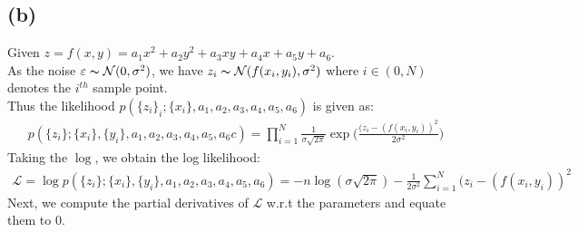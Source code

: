 \documentclass[11pt, fleqn]{article}
\begin{document}
\subsection*{(b)}
Given $z = f(x,y) = a_1 x^2 + a_2 y^2 + a_3 xy + a_4 x + a_5 y + a_6$. \\
As the noise $\varepsilon \thicksim \mathcal{N}(0, \sigma^2)$, we have $ z_i \thicksim \mathcal{N}(f(x_i, y_i), \sigma^2) $ where $i \in (0, N)$ denotes the $i^{th}$ sample point. \\
Thus the likelihood $p(\{z_i\}_i; \{x_i\}, a_1, a_2, a_3, a_4, a_5, a_6)$ is given as:
\begin{equation*}
    \begin{split}
        p(\{z_i\}; \{x_i\}, \{y_i\}, a_1, a_2, a_3, a_4, a_5, a_6c) = \prod_{i=1}^{N}\frac{1}{\sigma\sqrt{2\pi}} \exp{\bigg(\frac{(z_i - (f(x_i,y_i))^2}{2\sigma^2}\bigg)}
    \end{split}
\end{equation*}
Taking the $\log$, we obtain the log likelihood:
\begin{equation}
    \label{logl1}
    \begin{split}
        \boxed{\mathcal{L} = \log{p(\{z_i\}; \{x_i\}, \{y_i\}, a_1, a_2, a_3, a_4, a_5, a_6)} = - n\log(\sigma\sqrt{2\pi}) -\frac{1}{{2\sigma^2}}\sum_{i=1}^{N} (z_i - (f(x_i,y_i))^2 }
    \end{split}
\end{equation}
Next, we compute the partial derivatives of $\mathcal{L}$ w.r.t the parameters and equate them to 0.
\end{document}
